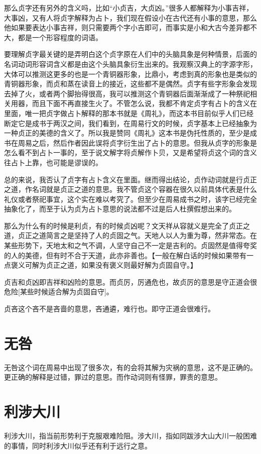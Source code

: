 \documentclass[12pt,oneside]{book}
\begin{document}
那么贞字还有另外的含义吗，比如“小贞吉，大贞凶。”很多人都解释为小事吉祥，大事凶，又有人将贞字解释为占卜，我们现在假设小在古代还有小事的意思，那么他如果要表达小事吉祥，则只需要两个字小吉即可，而事实是小和大古今差异都不大，都是一个形容程度的词语。

要理解贞字最关键的是弄明白这个贞字原在人们中的头脑具象是何种情景，后面的名词动词形容词含义都是由这个头脑具象衍生出来的。我观察汉典上的字源字形，大体可以推测这更多的也是一个青铜器形象，比鼎小，考虑到真的形象也是类似的青铜器形象，而贞和蒸在读音上的接近，这些都不是偶然。贞字有些字形象会发现去掉了火，或者两个脚抬得很高，我可以推测这个青铜器后面渐渐成了一种祭祀相关用器，而且下面不再直接生火了。不管怎么说，我都不肯定贞字有占卜的含义在里面，唯一把贞字做占卜解释的那本书就是《周礼》，而这本书目前似乎人们已经断定它是成书于两汉之间，我们看到，在周易行文的时候，贞字基本上已经抽象为一种贞正的美德的含义了。所以我是赞同《周礼》这本书是伪托性质的，至少是成书在周易之后，然后作者因此误将贞字衍生出了占卜的意思。但我从贞字的形象是怎么看不到占卜一事的，至于说文解字将贞解作卜贝，又是希望将贞这个词的含义往占卜上靠，也可能是谬误的。

总的来说，我否认了贞字有占卜含义在里面。继而得出结论，贞作动词就是行贞正之道，作名词就是贞正之道的意思。我不管贞这个容器在很久以前具体代表是什么礼仪或者祭祀事宜，这个实在难以考究了。但至少在周易成书之时，该字已经完全抽象化了，而至于认为贞为占卜意思的说法都不过是后人杜撰假想出来的。

那么为什么有的时候是利贞，有的时候贞凶呢？文天祥从容就义是完全了贞正之道，贞正之道简言之是坚持了人的贞固之气。天地人以人为重为尊，然非常态。在某些形势下，天地太和之气不调，人坚守自己不一定是吉利的。贞固然是值得夸奖的人的美德，但有时不合于天道，此亦非善也。【一般在解白话的时候如果带有一点褒义可解为贞正之道，如果没有褒义则最好解为贞固自守。】

贞吉和贞凶即吉祥和凶险的意思。而贞厉，厉通危也，故贞厉的意思是守正道会很危险[某些时候适合解为贞固自守]。

贞吝这个吝不是吝啬的意思，吝通遴，难行也。即守正道会很难行。


\section{无咎}
无咎这个词在周易中出现了很多次，有的会将其解为灾祸的意思，这不是正确的。更正确的解释是过错，罪过的意思。而作动词则有怪罪，罪责的意思。

\section{利涉大川}
利涉大川，指当前形势利于克服艰难险阻。涉大川，指如同跋涉大山大川一般困难的事情，同时利涉大川似乎还有利于远行之意。
\end{document}
